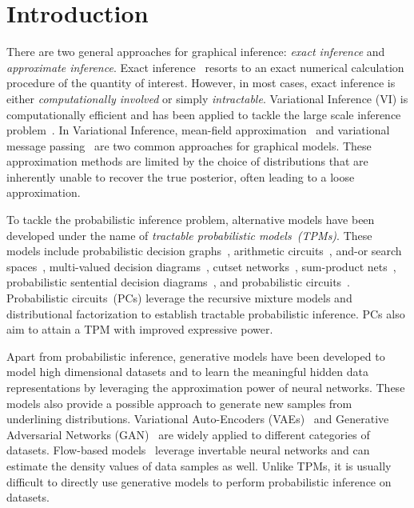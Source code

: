 \documentclass[sigconf, anonymous, review]{acmart}
\theoremstyle{plain}
\theoremstyle{definition}
\theoremstyle{remark}
\begin{document}
\maketitle

\section{Introduction}
 There are two general approaches for graphical inference: \textit{exact inference} and \textit{approximate inference}. Exact inference~\cite{sanner2012symbolic,kahle2008junction} resorts to an exact numerical calculation procedure of the quantity of interest. 
However, in most cases, exact inference is either \emph{computationally involved} or simply \emph{intractable}. 
Variational Inference (VI) is computationally efficient and has been applied to tackle the large scale inference problem~\cite{jordan1999introduction,hoffman2013stochastic}.
In Variational Inference, mean-field approximation~\cite{xing2012generalized} and variational message passing~\cite{bishop2003vibes,winn2005variational} are two common approaches for graphical models.
These approximation methods are limited by the choice of distributions that are inherently unable to recover the true posterior, often leading to a loose approximation. 

To tackle the probabilistic inference problem, alternative models have been developed under the name of \emph{tractable probabilistic models~(TPMs)}. These models include probabilistic decision graphs~\cite{jaeger2006learning}, arithmetic circuits~\cite{darwiche2003differential}, and-or search spaces~\cite{marinescu2005and},
multi-valued decision diagrams~\cite{dechter2007and},
cutset networks~\cite{rahman2014cutset}, sum-product nets~\cite{sanchez2021sum}, probabilistic sentential decision diagrams~\cite{kisa2014probabilistic}, and probabilistic circuits~\cite{choi2020probabilistic}. Probabilistic circuits~(PCs) leverage the recursive mixture models and distributional factorization to establish tractable probabilistic inference. PCs also aim to attain a TPM with improved expressive power. 

Apart from probabilistic inference, generative models have been developed to model high dimensional datasets and to learn the  meaningful  hidden data representations by leveraging the approximation power of neural networks. These models also provide a possible approach to generate new samples from  underlining distributions. Variational Auto-Encoders (VAEs)~\cite{kingma2013auto} and Generative Adversarial Networks (GAN)~\cite{Goodfellow14} are widely applied to different categories of datasets. Flow-based models~\cite{Dinh2016DensityEU, dinh2014nice,rezende2015variational,berg2018sylvester} leverage invertable neural networks and can estimate the density values of data samples as well. Unlike TPMs, it is usually difficult to directly use generative models to perform probabilistic inference on datasets. 
\end{document}

